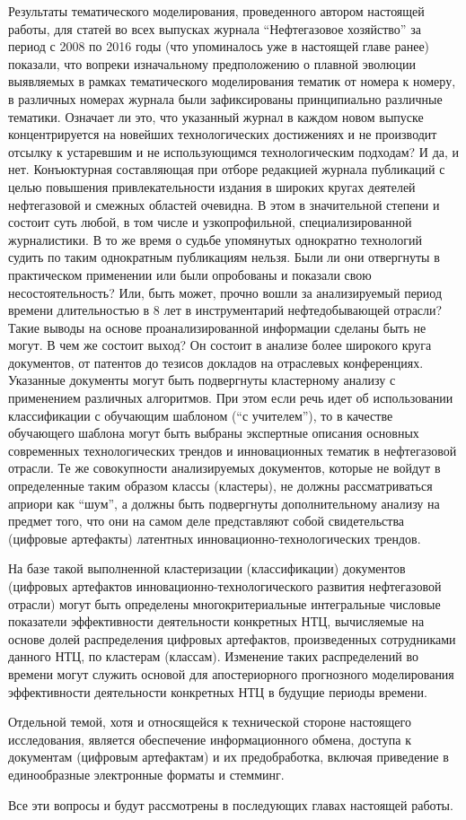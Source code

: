 Результаты тематического моделирования, проведенного автором настоящей работы, для статей во всех выпусках журнала ``Нефтегазовое хозяйство'' за период с 2008 по 2016 годы (что упоминалось уже в настоящей главе ранее) показали, что вопреки изначальному предположению о плавной эволюции выявляемых в рамках тематического моделирования тематик от номера к номеру, в различных номерах журнала были зафиксированы принципиально различные тематики.
Означает ли это, что указанный журнал в каждом новом выпуске концентрируется на новейших технологических достижениях и не производит отсылку к устаревшим и не использующимся технологическим подходам? И да, и нет.
Конъюктурная составляющая при отборе редакцией журнала публикаций с целью повышения привлекательности издания в широких кругах деятелей нефтегазовой и смежных областей очевидна.
В этом в значительной степени и состоит суть любой, в том числе и узкопрофильной, специализированной журналистики.
В то же время о судьбе упомянутых однократно технологий судить по таким однократным публикациям нельзя.
Были ли они отвергнуты в практическом применении или были опробованы и показали свою несостоятельность? 
Или, быть может, прочно вошли за анализируемый период времени длительностью в 8 лет в инструментарий нефтедобывающей отрасли? 
Такие выводы на основе проанализированной информации сделаны быть не могут.
В чем же состоит выход? 
Он состоит в анализе более широкого круга документов, от патентов до тезисов докладов на отраслевых конференциях.
Указанные документы могут быть подвергнуты кластерному анализу с применением различных алгоритмов.
При этом если речь идет об использовании классификации с обучающим шаблоном (``с учителем''), то в качестве обучающего шаблона могут быть выбраны экспертные описания основных современных технологических трендов и инновационных тематик в нефтегазовой отрасли.
Те же совокупности анализируемых документов, которые не войдут в определенные таким образом классы (кластеры), не должны рассматриваться априори как ``шум'', а должны быть подвергнуты дополнительному анализу на предмет того, что они на самом деле представляют собой свидетельства (цифровые артефакты) латентных инновационно-технологических трендов.

На базе такой выполненной кластеризации (классификации) документов (цифровых артефактов инновационно-технологического развития нефтегазовой отрасли) могут быть определены многокритериальные интегральные числовые показатели эффективности деятельности конкретных НТЦ, вычисляемые на основе долей распределения цифровых артефактов, произведенных сотрудниками данного НТЦ, по кластерам (классам).
Изменение таких распределений во времени могут служить основой для апостериорного прогнозного моделирования эффективности деятельности конкретных НТЦ в будущие периоды времени.

Отдельной темой, хотя и относящейся к технической стороне настоящего исследования, является обеспечение информационного обмена, доступа к документам (цифровым артефактам) и их предобработка, включая приведение в единообразные электронные форматы и стемминг.

Все эти вопросы и будут рассмотрены в последующих главах настоящей работы.
